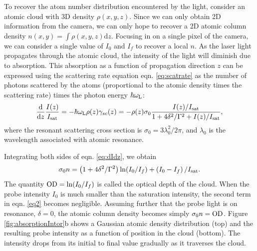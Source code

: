 To recover the atom number distribution encountered by the light, consider an atomic cloud with 3D density $\rho(x,y,z)$. Since we can only obtain 2D information from the camera, we can only hope to recover a 2D atomic column density $n(x,y)=\int\rho(x,y,z)\mathrm{d}z$. Focusing in on a single pixel of the camera, we can consider a single value of $I_0$ and $I_f$ to recover a local $n$. As the laser light propagates through the atomic cloud, the intensity of the light will diminish due to absorption. This absorption as a function of propagation direction $z$ can be expressed using the scattering rate equation eqn. \ref{eq:scatrate} as the number of photons scattered by the atoms (proportional to the atomic density times the scattering rate) times the photon energy $\hbar\omega_{\rm{L}}$:
\begin{equation}
\frac{{\rm d}}{{\rm d}z}\frac{I(z)}{I_{\rm{sat}}}=-\hbar\omega_{\rm{L}}\rho(z)\gamma_{sc}(z)=-\rho(z)\sigma_0\frac{I(z)/I_{\rm{sat}}}{1+4\delta^2 /\Gamma^2+I(z)/I_{\rm{sat}}},
\label{eq:dIdz}
\end{equation}
where the resonant scattering cross section is $\sigma_0=3\lambda_0^2/2\pi$, and $\lambda_0$ is the wavelength associated with atomic resonance. 

Integrating both sides of eqn. \ref{eq:dIdz}, we obtain
\begin{equation}
\sigma_0 n = \left(1+4\delta^2/\Gamma^2\right)\mathrm{ln}(I_0/I_f)+ \left(I_0-I_f\right)/I_{\rm{sat}}.
\label{eq2}
\end{equation}
The quantity ${\rm OD}={\rm ln}(I_0/I_f)$ is called the optical depth of the cloud. When the probe intensity $I_0$ is much smaller than the saturation intensity, the second term in eqn. \ref{eq2} becomes negligible. Assuming further that the probe light is on resonance, $\delta=0$, the atomic column density becomes simply $\sigma_0 n={\rm OD}$. Figure \ref{fig:absorptionIntor}b shows a Gaussian atomic density distribution (top) and the resulting probe intensity as a function of position in the cloud (bottom). The intensity drops from its initial to final value gradually as it traverses the cloud.

